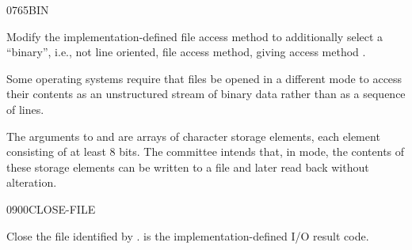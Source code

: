 \begin{worddef}{0765}{BIN}
\item {}

	Modify the implementation-defined file access method
	 to additionally select a \linebreak
	``binary'', i.e., not line oriented, file access method,
	giving access method .


	\begin{rationale} %
		Some operating systems require that files be opened in a
		different mode to access their contents as an unstructured
		stream of binary data rather than as a sequence of lines.

		The arguments to  and  are
		arrays of character storage elements, each element consisting
		of at least 8 bits. The committee intends that, in
		 mode, the contents of these storage elements can be
		written to a file and later read back without alteration.
	\end{rationale}
\end{worddef}

\begin{worddef}{0900}{CLOSE-FILE}
\item {}

	Close the file identified by .  is the
	implementation-defined I/O result code.
\end{worddef}

